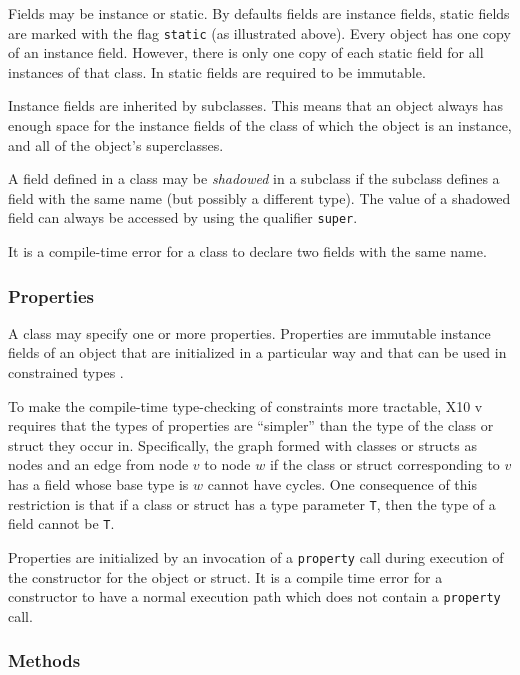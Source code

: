 Fields may be instance or static. By defaults fields are instance
fields, static fields are marked with the flag {\tt static} (as
illustrated above). Every object has one copy of an instance
field. However, there is only one copy of each static field for all
instances of that class. In \Xten{} static fields are required to be
immutable.

Instance fields are inherited by subclasses. This means that an object
always has enough space for the instance fields of the class of which
the object is an instance, and all of the object's superclasses.

A field defined in a class may be {\em shadowed} in a subclass if the
subclass defines a field with the same name (but possibly a different
type). The value of a shadowed field can always be accessed by using
the qualifier {\tt super}.

It is a compile-time error for a class to declare two fields with the
same name.

\subsubsection{Properties} \label{x10-basic-properties}
A class may specify one or more properties. Properties are immutable
instance fields of an object that are initialized in a particular way
and that can be used in constrained types
. 

To make the compile-time type-checking of constraints more tractable,
X10 v~\CurrVer{} requires 
that the types of properties are ``simpler'' than the type of the
class or struct they occur in. Specifically, the graph formed with
classes or structs as nodes and an edge from node $v$ to node $w$ if
the class or struct corresponding to $v$ has a field whose base type
is $w$ cannot have cycles. One consequence of this restriction is that
if a class or struct has a type parameter {\tt T}, then the type of a
field cannot be {\tt T}. 


Properties are initialized by an invocation of a {\tt property} call
during execution of the constructor  for
the object or struct. It is a compile time error for a constructor to
have a normal execution path which does not contain a {\tt property}
call. 

\subsubsection{Methods}\label{x10-basic-methods}

